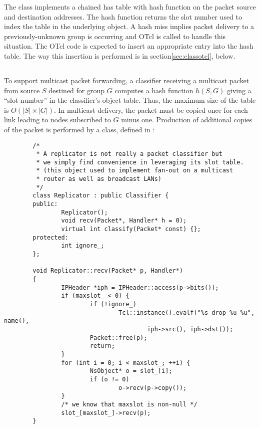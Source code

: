 The  class implements a chained has table
with hash function on the packet source and destination addresses.
The hash function returns the slot number used to index the 
table in the underlying  object.
A hash miss implies packet delivery to a previously-unknown group is
occurring and OTcl is called to handle this situation.
The OTcl code is expected to insert an appropriate entry into the
hash table.
The way this insertion is performed is in section\ref{sec:classotcl}, below.

\subsection{}

To support multicast packet forwarding, a classifier receiving a
multicast packet from source $S$
destined for group $G$ computes a hash function $h(S,G)$ giving
a ``slot number'' in the classifier's object table.
Thus, the maximum size of the table is $O(|S|\times|G|)$.
In multicast delivery, the packet must be copied once for
each link leading to nodes subscribed to $G$ minus one.
Production of additional copies of the packet is performed
by a  class, defined in :
\begin{small}
\begin{verbatim}
        /*
         * A replicator is not really a packet classifier but
         * we simply find convenience in leveraging its slot table.
         * (this object used to implement fan-out on a multicast
         * router as well as broadcast LANs)
         */
        class Replicator : public Classifier {
        public:
                Replicator();
                void recv(Packet*, Handler* h = 0);
                virtual int classify(Packet* const) {};
        protected:
                int ignore_;
        };

        void Replicator::recv(Packet* p, Handler*)
        {
                IPHeader *iph = IPHeader::access(p->bits());
                if (maxslot_ < 0) {
                        if (!ignore_)
                                Tcl::instance().evalf("%s drop %u %u", name(), 
                                        iph->src(), iph->dst());
                        Packet::free(p);
                        return;
                }
                for (int i = 0; i < maxslot_; ++i) {
                        NsObject* o = slot_[i];
                        if (o != 0)
                                o->recv(p->copy());
                }
                /* we know that maxslot is non-null */
                slot_[maxslot_]->recv(p);
        }
\end{verbatim}
\end{small}
